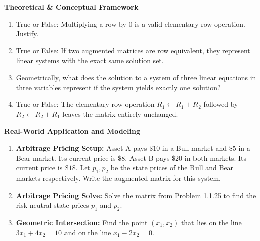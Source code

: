\documentclass[11pt]{article}
\begin{document}
\textbf{Theoretical \& Conceptual Framework}
\begin{enumerate}[label=\textbf{1.1.\arabic*}, resume]
    \item True or False: Multiplying a row by 0 is a valid elementary row operation. Justify.
    \item True or False: If two augmented matrices are row equivalent, they represent linear systems with the exact same solution set.
    \item Geometrically, what does the solution to a system of three linear equations in three variables represent if the system yields exactly one solution?
    \item True or False: The elementary row operation $R_1 \leftarrow R_1 + R_2$ followed by $R_2 \leftarrow R_2 + R_1$ leaves the matrix entirely unchanged.
\end{enumerate}

\textbf{Real-World Application and Modeling}
\begin{enumerate}[label=\textbf{1.1.\arabic*}, resume]
    \item \textbf{Arbitrage Pricing Setup:} Asset A pays $\$10$ in a Bull market and $\$5$ in a Bear market. Its current price is $\$8$. Asset B pays $\$20$ in both markets. Its current price is $\$18$. Let $p_1, p_2$ be the state prices of the Bull and Bear markets respectively. Write the augmented matrix for this system.
    \item \textbf{Arbitrage Pricing Solve:} Solve the matrix from Problem 1.1.25 to find the risk-neutral state prices $p_1$ and $p_2$.
    \item \textbf{Geometric Intersection:} Find the point $(x_1, x_2)$ that lies on the line $3x_1 + 4x_2 = 10$ and on the line $x_1 - 2x_2 = 0$.
\end{enumerate}
\end{document}
